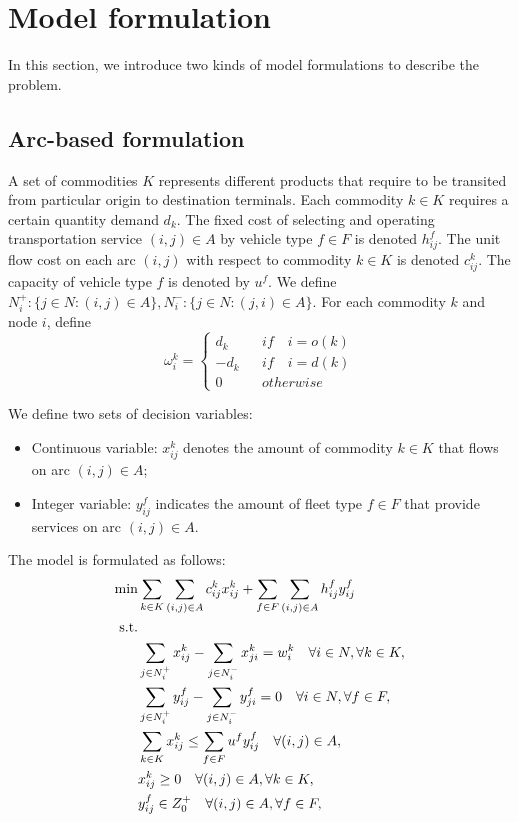 \documentclass[11pt,nonblindrev,fleqn]{article}
\begin{document}
\section{Model formulation}
In this section, we introduce two kinds of model formulations to describe the problem.

\subsection{Arc-based formulation}
A set of commodities $K$ represents different products that require to be transited from particular origin to destination terminals. Each commodity $k\in K$ requires a certain quantity demand $d_k$. The fixed cost of selecting and operating transportation service $(i,j)\in A$ by vehicle type $f\in F$ is denoted $h_{ij}^f$. The unit flow cost on each arc $(i,j)$ with respect to commodity $k\in K$ is denoted $c_{ij}^k$. The capacity of vehicle type $f$ is denoted by $u^f$. We define $N_i^+:\{j\in N:(i,j)\in A\},N_i^-:\{j\in N:(j,i)\in A\}$. For each commodity $k$ and node $i$, define
\begin{equation*}
\omega_i^k= \left\{
\begin{aligned}
d_k &  & if \quad i=o(k) \\
-d_k &  & if \quad i=d(k) \\
0 &  & otherwise
\end{aligned}
\right.
\end{equation*}

We define two sets of decision variables:
\begin{itemize}
  \item Continuous variable: $x_{ij}^k$ denotes the amount of commodity $k\in K$ that flows on arc $(i,j)\in A$;
  \item Integer variable: $y_{ij}^f$ indicates the amount of fleet type $f\in F$ that provide services on arc $(i,j)\in A$.
\end{itemize}

The model is formulated as follows:
\begin{align}
  \min & \sum_{k\in K}\sum_{(i,j)\in A} c_{ij}^k x_{ij}^k + \sum_{f\in F}\sum_{(i,j)\in A}h_{ij}^f y_{ij}^f    \label{objA}  \\
  \rm{s.t.} \nonumber  \\
         &  \sum_{j\in N_i^+}x_{ij}^k - \sum_{j\in N_i^-}x_{ji}^k = w_i^k     \quad     \forall i\in N, \forall k\in K,     \label{demandA}  \\
         &   \sum_{j\in N_i^+}y_{ij}^f - \sum_{j\in N_i^-}y_{ji}^f = 0  \quad     \forall i\in N, \forall f\in F,   \label{dbA} \\
         &   \sum_{k\in K}x_{ij}^k \leq \sum_{f\in F}u^f y_{ij}^f  \quad  \forall (i,j)\in A,   \label{capacityA} \\
         &    x_{ij}^k \geq 0  \quad  \forall (i,j)\in A, \forall k\in K,   \label{xA} \\
         &   y_{ij}^f \in Z_0^+  \quad  \forall (i,j)\in A,\forall f\in F, \label{yA}
\end{align}
\end{document}
